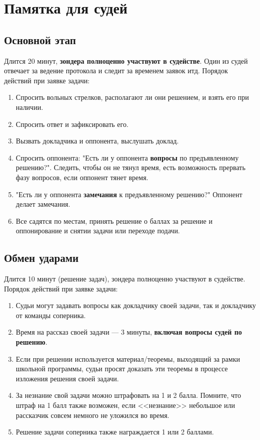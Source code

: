 \documentclass[12pt]{article}
\begin{document}
\section*{Памятка для судей}
\subsection*{Основной этап}
Длится 20 минут, {\bf зондера полноценно участвуют в судействе}. Один из судей отвечает за ведение протокола и следит за временем заявок итд.
Порядок действий при заявке задачи:
\begin{enumerate}
	\item Спросить вольных стрелков, располагают ли они решением, и взять его при наличии.
	\item Спросить ответ и зафиксировать его.
	\item Вызвать докладчика и оппонента, выслушать доклад.
	\item Спросить оппонента: "Есть ли у оппонента {\bf вопросы} по предъявленному решению?". Следить, чтобы он не тянул время, есть возможность прервать фазу вопросов, если оппонент тянет время.
	\item "Есть ли у оппонента {\bf замечания} к предъявленному решению?" Оппонент делает замечания.
	\item Все садятся по местам, принять решение о баллах за решение и оппонирование и снятии задачи или переходе подачи.
\end{enumerate}

\subsection*{Обмен ударами}
Длится 10 минут (решение задач), зондера полноценно участвуют в судействе.
Порядок действий при заявке задачи:
\begin{enumerate}
	\item Судьи могут задавать вопросы как докладчику своей задачи, так и докладчику от команды соперника.
	\item Время на рассказ своей задачи --- 3 минуты, {\bf включая вопросы судей по решению}.
	\item Если при решении используется материал/теоремы, выходящий за рамки школьной программы, судьи просят доказать эти теоремы в процессе изложения решения своей задачи. 
	\item За незнание свой задачи можно штрафовать на 1 и 2 балла. Помните, что штраф на 1 балл также возможен, если <<незнание>> небольшое или рассказчик совсем немного не уложился во время.
	\item Решение задачи соперника также награждается 1 или 2 баллами.
\end{enumerate}
\end{document}
